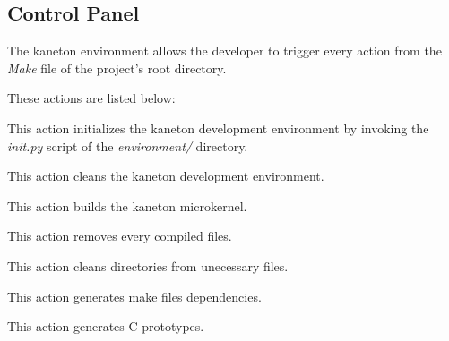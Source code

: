 %
%
%
%
%
%

%
%

\subsection{Control Panel}
\label{section:control panel}

The kaneton environment allows the developer to trigger every action from
the \textit{Make} file of the project's root directory.

These actions are listed below:

        {
	  This action initializes the kaneton development environment by
	  invoking the \textit{init.py} script of the \textit{environment/}
	  directory.

	  \-

	}

	{
	  This action cleans the kaneton development environment.

	  \-

	}

	{
	  This action builds the kaneton microkernel.

	  \-

	}

	{
	  This action removes every compiled files.

	  \-

	}

	{
	  This action cleans directories from unecessary files.

	  \-

	}

	{
	  This action generates make files dependencies.

	  \-

	}

	{
	  This action generates C prototypes.

	  \-

	}

